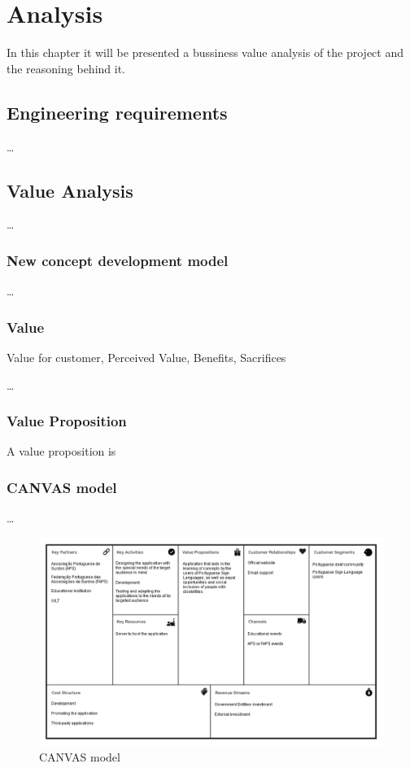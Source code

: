 
\chapter{Analysis} %
\label{chap:Chapter2} %

In this chapter it will be presented a bussiness value analysis of the project and the reasoning behind it. 

\section{Engineering requirements}

\dots

\section{Value Analysis}

\dots

\subsection{New concept development model}

\dots

\subsection{Value}

Value for customer, Perceived Value, Benefits, Sacrifices

\dots

\subsection{Value Proposition}

A value proposition is 

\subsection{CANVAS model}

\dots

\begin{figure}[H]
\centering
\includegraphics[width=\textwidth,keepaspectratio]{ch2/assets/CANVAS.png}
\caption[CANVAS]{CANVAS model}
\label{fig:CANVAS}
\end{figure}

